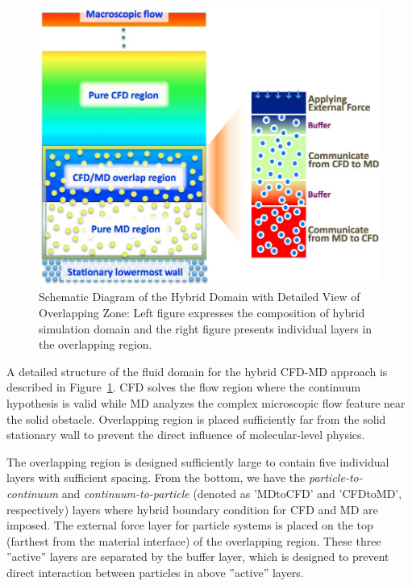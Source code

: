 \documentclass[]{aiaa-tc}%
\begin{document}
\begin{figure}
\includegraphics{Hybrid_Schematic.jpg}
\caption{Schematic Diagram of the Hybrid Domain with Detailed View of Overlapping Zone: 
Left figure expresses the composition of hybrid simulation domain and 
the right figure presents individual layers in the overlapping region.}
\label{Fig:Couette}
\end{figure}


A detailed structure of the fluid domain for the hybrid CFD-MD approach is
described in Figure~\ref{Fig:Couette}. CFD solves the flow region where 
the continuum hypothesis is valid while MD analyzes the complex microscopic 
flow feature near the solid obstacle. Overlapping region is placed sufficiently 
far from the solid stationary wall to prevent the direct influence of 
molecular-level physics.

The overlapping region is designed sufficiently large to contain 
five individual layers with sufficient spacing. From the bottom, 
we have the {\it{particle-to-continuum}} and {\it{continuum-to-particle}} 
(denoted as 'MDtoCFD' and 'CFDtoMD', respectively) layers where hybrid
boundary condition for CFD and MD are imposed. The external force layer
for particle systems is placed on the top (farthest from the
material interface) of the overlapping region. These three ''active'' layers 
are separated by the buffer layer, which is designed to prevent direct 
interaction between particles in above ''active'' layers.
\end{document}
